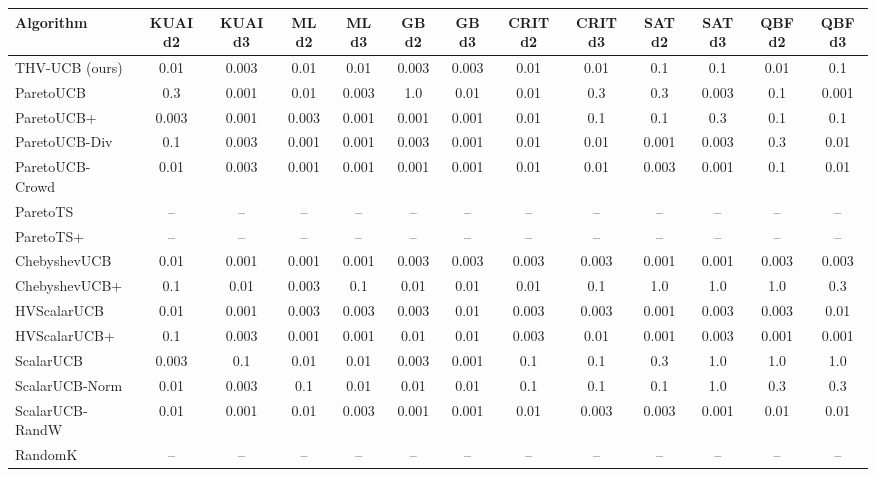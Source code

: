 \begin{tabular}{lcccccccccccc}
\toprule
Algorithm & KUAI d2 & KUAI d3 & ML d2 & ML d3 & GB d2 & GB d3 & CRIT d2 & CRIT d3 & SAT d2 & SAT d3 & QBF d2 & QBF d3\\
\midrule
THV-UCB (ours) & 0.01 & 0.003 & 0.01 & 0.01 & 0.003 & 0.003 & 0.01 & 0.01 & 0.1 & 0.1 & 0.01 & 0.1\\
ParetoUCB & 0.3 & 0.001 & 0.01 & 0.003 & 1.0 & 0.01 & 0.01 & 0.3 & 0.3 & 0.003 & 0.1 & 0.001\\
ParetoUCB+ & 0.003 & 0.001 & 0.003 & 0.001 & 0.001 & 0.001 & 0.01 & 0.1 & 0.1 & 0.3 & 0.1 & 0.1\\
ParetoUCB-Div & 0.1 & 0.003 & 0.001 & 0.001 & 0.003 & 0.001 & 0.01 & 0.01 & 0.001 & 0.003 & 0.3 & 0.01\\
ParetoUCB-Crowd & 0.01 & 0.003 & 0.001 & 0.001 & 0.001 & 0.001 & 0.01 & 0.01 & 0.003 & 0.001 & 0.1 & 0.01\\
ParetoTS & -- & -- & -- & -- & -- & -- & -- & -- & -- & -- & -- & --\\
ParetoTS+ & -- & -- & -- & -- & -- & -- & -- & -- & -- & -- & -- & --\\
ChebyshevUCB & 0.01 & 0.001 & 0.001 & 0.001 & 0.003 & 0.003 & 0.003 & 0.003 & 0.001 & 0.001 & 0.003 & 0.003\\
ChebyshevUCB+ & 0.1 & 0.01 & 0.003 & 0.1 & 0.01 & 0.01 & 0.01 & 0.1 & 1.0 & 1.0 & 1.0 & 0.3\\
HVScalarUCB & 0.01 & 0.001 & 0.003 & 0.003 & 0.003 & 0.01 & 0.003 & 0.003 & 0.001 & 0.003 & 0.003 & 0.01\\
HVScalarUCB+ & 0.1 & 0.003 & 0.001 & 0.001 & 0.01 & 0.01 & 0.003 & 0.01 & 0.001 & 0.003 & 0.001 & 0.001\\
ScalarUCB & 0.003 & 0.1 & 0.01 & 0.01 & 0.003 & 0.001 & 0.1 & 0.1 & 0.3 & 1.0 & 1.0 & 1.0\\
ScalarUCB-Norm & 0.01 & 0.003 & 0.1 & 0.01 & 0.01 & 0.01 & 0.1 & 0.1 & 0.1 & 1.0 & 0.3 & 0.3\\
ScalarUCB-RandW & 0.01 & 0.001 & 0.01 & 0.003 & 0.001 & 0.001 & 0.01 & 0.003 & 0.003 & 0.001 & 0.01 & 0.01\\
RandomK & -- & -- & -- & -- & -- & -- & -- & -- & -- & -- & -- & --\\
\bottomrule
\end{tabular}
